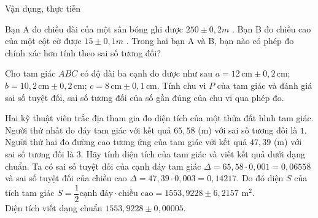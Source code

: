 \begin{dang}{Vận dụng, thực tiễn}
	
\end{dang}

\begin{vd}
	Bạn A đo chiều dài của một sân bóng ghi được $250\pm 0,2m$ . Bạn B đo chiều cao của một cột cờ được $15\pm 0,1m$ . Trong hai bạn A và B, bạn nào có phép đo chính xác hơn tính theo sai số tương đối?
\end{vd} 

\begin{vd}%
	Cho tam giác $ABC$ có độ dài ba cạnh đo được như sau $a=12\,\text{cm}\pm 0,2\,\text{cm}$; $b=10,2\,\text{cm}\pm 0,2\,\text{cm}$; $c=8\,\text{cm}\pm 0,1\,\text{cm}$. Tính chu vi $P$ của tam giác và đánh giá sai số tuyệt đối, sai số tương đối của số gần đúng của chu vi qua phép đo.
\end{vd} 


\begin{vd}%
	Hai kỹ thuật viên trắc địa tham gia đo diện tích của một thửa đất hình tam giác. Người thứ nhất đo đáy tam giác với kết quả $ 65{,}58 $ (m) với sai số tương đối là $ 1 $\textperthousand. Người thứ hai đo đường cao tương ứng của tam giác với kết quả $ 47{,}39 $ (m) với sai số tương đối là $ 3 $\textperthousand. Hãy tính diện tích của tam giác và viết kết quả dưới dạng chuẩn.
	\loigiai
	{
		Ta có sai số tuyệt đối của cạnh đáy tam giác $ \Delta =65{,}58\cdot 0{,}001=0{,}06558 $ và sai số tuyệt đối của chiều cao $ \Delta =47{,}39\cdot 0{,}003=0{,}14217 $. Do đó diện $ S $ của tích tam giác $ S=\dfrac{1}{2}\text{cạnh đáy}\cdot \text{chiều cao}=1553{,}9228\pm 6{,}2157 $ m$ ^2 $.\\
		Diện tích viết dạng chuẩn $ 1553{,}9228\pm 0{,}00005 $.
	}
\end{vd} 
